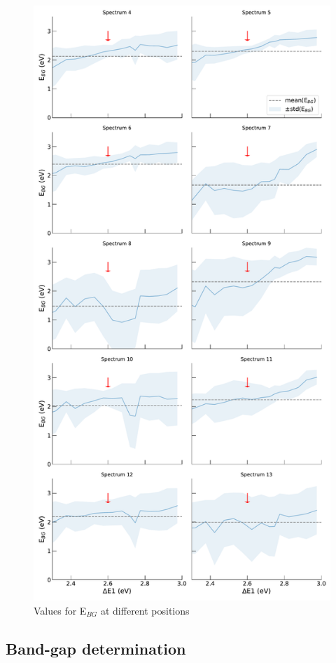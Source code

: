 \begin{figure}[ht]
\begin{centering}
\includegraphics[width=0.6\linewidth]{plots/bgvalues.pdf} 
\caption{Values for E$_{BG}$ at different positions}
\label{fig:bvalues}
\end{centering}
\end{figure}




\subsection{Band-gap determination}


